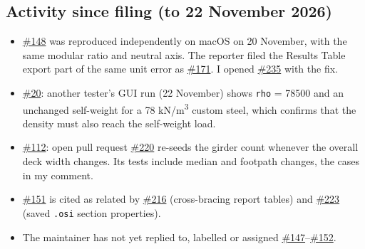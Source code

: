 \documentclass[11pt,a4paper]{article}
\newcommand{\issue}[1]{\href{https://github.com/Nidhikhare12/OsdagBridge/issues/#1}{\##1}}
\begin{document}
\subsection{Activity since filing (to 22 November 2026)}
\begin{itemize}
\item \issue{148} was reproduced independently on macOS on 20 November, with the same modular ratio and neutral axis. The
  reporter filed the Results Table export part of the same unit error as \issue{171}. I opened \issue{235} with the fix.
\item \issue{20}: another tester's GUI run (22 November) shows \texttt{rho} = 78500 and an unchanged self-weight for a
  78 kN/m\textsuperscript{3} custom steel, which confirms that the density must also reach the self-weight load.
\item \issue{112}: open pull request \issue{220} re-seeds the girder count whenever the overall deck width changes. Its
  tests include median and footpath changes, the cases in my comment.
\item \issue{151} is cited as related by \issue{216} (cross-bracing report tables) and \issue{223} (saved \texttt{.osi}
  section properties).
\item The maintainer has not yet replied to, labelled or assigned \issue{147}--\issue{152}.
\end{itemize}

\end{document}
